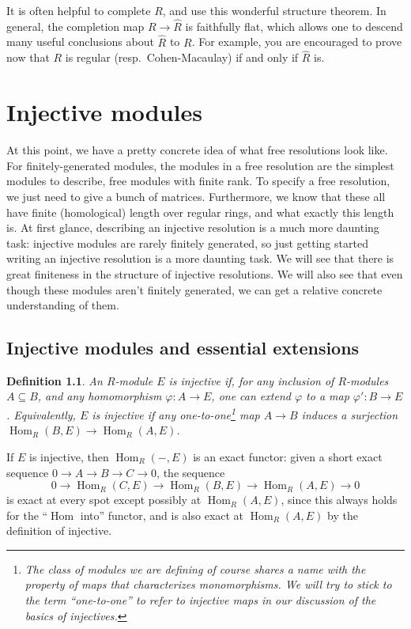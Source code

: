 \documentclass[11pt]{book}
\newtheorem{definition}[theorem]{Definition}
\numberwithin{equation}{section}
\numberwithin{theorem}{chapter}
\theoremstyle{definition}
\newtheorem*{basic properties}{Basic Properties}
\newtheorem*{Important Remark}{Important Remark}
\theoremstyle{remark}
\newcommand{\Hom}{\operatorname{Hom}}
\begin{document}
It is often helpful to complete $R$, and use this wonderful structure theorem. In general, the completion map $R\to \widehat{R}$ is faithfully flat, which allows one to descend many useful conclusions about $\widehat{R}$ to $R$. For example, you are encouraged to prove now that $R$ is regular (resp.~Cohen-Macaulay) if and only if $\widehat{R}$ is.



\chapter{Injective modules}

At this point, we have a pretty concrete idea of what free resolutions look like. For finitely-generated modules, the modules in a free resolution are the simplest modules to describe, free modules with finite rank. To specify a free resolution, we just need to give a bunch of matrices. Furthermore, we know that these all have finite (homological) length over regular rings, and what exactly this length is. At first glance, describing an injective resolution is a much more daunting task: injective modules are rarely finitely generated, so just getting started writing an injective resolution is a more daunting task. We will see that there is great finiteness in the structure of injective resolutions. We will also see that even though these modules aren't finitely generated, we can get a relative concrete understanding of them. 

\section{Injective modules and essential extensions}

\begin{definition}
	An $R$-module $E$ is \emph{injective} if, for any inclusion of $R$-modules $A \subseteq B$, and any homomorphism $\varphi:A\to E$, one can extend $\varphi$ to a map $\varphi':B\to E$. Equivalently, $E$ is injective if any one-to-one\footnote{The class of modules we are defining of course shares a name with the property of maps that characterizes monomorphisms. We will try to stick to the term ``one-to-one'' to refer to injective maps in our discussion of the basics of injectives.} map $A\to B$ induces a surjection $\Hom_R(B,E)\to \Hom_R(A,E)$.
\end{definition}

If $E$ is injective, then $\Hom_R(-,E)$ is an exact functor: given a short exact sequence $0 \to A \to B \to C \to 0$, the sequence
\[ 0 \to \Hom_R(C,E)\to \Hom_R(B,E)\to \Hom_R(A,E) \to 0\]
is exact at every spot except possibly at $\Hom_R(A,E)$, since this always holds for the ``$\Hom$ into'' functor, and is also exact at $\Hom_R(A,E)$ by the definition of injective.
\end{document}
